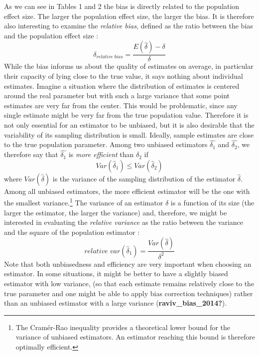\documentclass[
  english,
  man]{apa6}
\begin{document}
As we can see in Tables 1 and 2 the bias is directly related to the population effect size. The larger the population effect size, the larger the bias. It is therefore also interesting to examine the \emph{relative bias}, defined as the ratio between the bias and the population effect size :
\begin{equation} 
\delta_{relative \; bias}=\frac{E(\hat{\delta})-\delta}{\delta}
\label{eqn:RELBIAS}
\end{equation}
While the bias informs us about the quality of estimates on average, in particular their capacity of lying close to the true value, it says nothing about individual estimates. Imagine a situation where the distribution of estimates is centered around the real parameter but with such a large variance that some point estimates are very far from the center. This would be problematic, since any single estimate might be very far from the true population value. Therefore it is not only essential for an estimator to be unbiased, but it is also desirable that the variability of its sampling distribution is small. Ideally, sample estimates are close to the true population parameter. Among two unbiased estimators \(\hat{\delta_1}\) and \(\hat{\delta_2}\), we therefore say that \(\hat{\delta_1}\) is \emph{more efficient} than \(\hat{\delta_2}\) if
\begin{equation} 
Var(\hat{\delta}_1) \leq Var(\hat{\delta}_2)
\label{eqn:EFFICIENCY}
\end{equation}
where \(Var(\hat{\delta})\) is the variance of the sampling distribution of the estimator \(\hat{\delta}\). Among all unbiased estimators, the more efficient estimator will be the one with the smallest variance.\footnote{The Cramér-Rao inequality provides a theoretical lower bound for the variance of unbiased estimators. An estimator reaching this bound is therefore optimally efficient.} The variance of an estimator \(\hat{\delta}\) is a function of its size (the larger the estimator, the larger the variance) and, therefore, we might be interested in evaluating the \emph{relative variance} as the ratio between the variance and the square of the population estimator :
\begin{equation} 
relative \; var(\hat{\delta}_1)=\frac{Var(\hat{\delta})}{\delta^2}
\label{eqn:RELVAR}
\end{equation}
Note that both unbiasedness and efficiency are very important when choosing an estimator. In some situations, it might be better to have a slightly biased estimator with low variance, (so that each estimate remains relatively close to the true parameter and one might be able to apply bias correction techniques) rather than an unbiased estimator with a large variance (\textbf{raviv\_bias\_2014?}).
\end{document}
